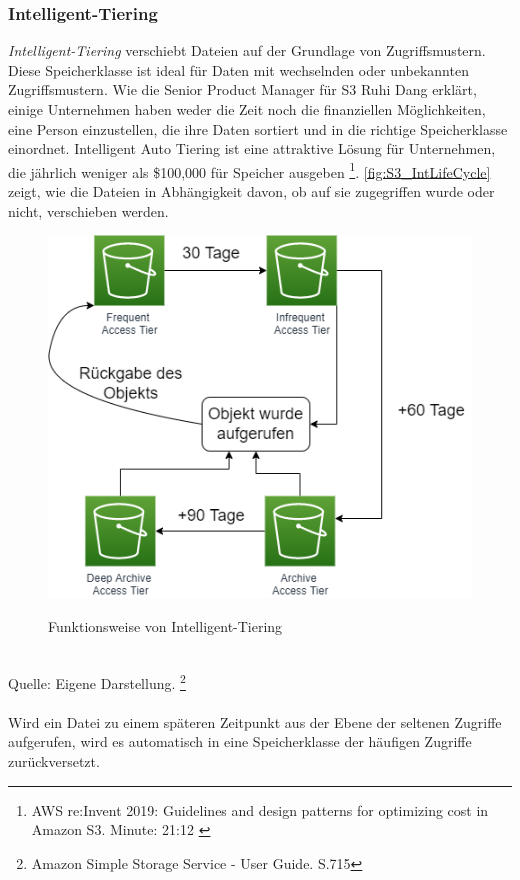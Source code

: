 \subsubsection{Intelligent-Tiering}
\textit{Intelligent-Tiering} verschiebt Dateien auf der Grundlage von Zugriffsmustern. Diese Speicherklasse ist ideal für Daten mit wechselnden oder unbekannten Zugriffsmustern. 
Wie die Senior Product Manager für S3 Ruhi Dang erklärt, einige Unternehmen haben weder die Zeit noch die finanziellen Möglichkeiten, eine Person einzustellen, die ihre Daten sortiert und in die richtige Speicherklasse einordnet. Intelligent Auto Tiering ist eine attraktive Lösung für Unternehmen, die jährlich weniger als \$100,000 für Speicher ausgeben \footnote{AWS re:Invent 2019: Guidelines and design patterns for optimizing cost in Amazon S3. Minute: 21:12 \cite{AMZ16}}.
\autoref{fig:S3_IntLifeCycle} zeigt, wie die Dateien in Abhängigkeit davon, ob auf sie zugegriffen wurde oder nicht, verschieben werden. 
\begin{figure}[h!]
  \centering
  \includegraphics[scale=0.7]{sources/S3_IntLifeCycle}
  \caption[Funktionsweise von Intelligent-Tiering]{}\label{fig:S3_IntLifeCycle} Funktionsweise von Intelligent-Tiering
\end{figure}\\
Quelle: Eigene Darstellung. \footnote{Amazon Simple Storage Service - User Guide. S.715\cite{AMZ18}}
\\\\
Wird ein Datei zu einem späteren Zeitpunkt aus der Ebene der seltenen Zugriffe aufgerufen, wird es automatisch in eine Speicherklasse der häufigen Zugriffe zurückversetzt.















